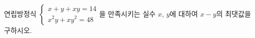 연립방정식 $\begin{cases} x+y+xy=14 \\ x^2y+xy^2=48 \end{cases}$을 만족시키는 실수 $x$, $y$에 대하여 $x-y$의 최댓값을 구하시오.
